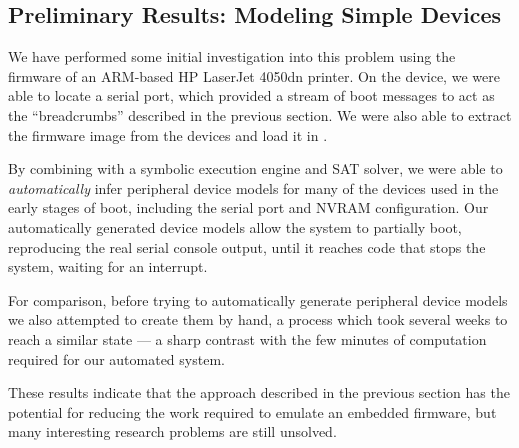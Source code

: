 \subsection{Preliminary Results: Modeling Simple Devices}

We have performed some initial investigation into this problem using the
firmware of an ARM-based HP LaserJet 4050dn printer. On the device, we
were able to locate a serial port, which provided a stream of boot
messages to act as the ``breadcrumbs'' described in the previous
section. We were also able to extract the firmware image from the
devices and load it in \dynamicsys.

By combining \dynamicsys with a symbolic execution engine and SAT
solver, we were able to \emph{automatically} infer peripheral device
models for many of the devices used in the early stages of boot,
including the serial port and NVRAM configuration. Our automatically
generated device models allow the system to partially boot, reproducing
the real serial console output, until it reaches code that stops the
system, waiting for an interrupt.

For comparison, before trying to automatically generate peripheral
device models we also attempted to create them by hand, a process which
took several weeks to reach a similar state --- a sharp contrast with
the few minutes of computation required for our automated system.

These results indicate that the approach described in the previous
section has the potential for reducing the work required to emulate an
embedded firmware, but many interesting research problems are still
unsolved.


